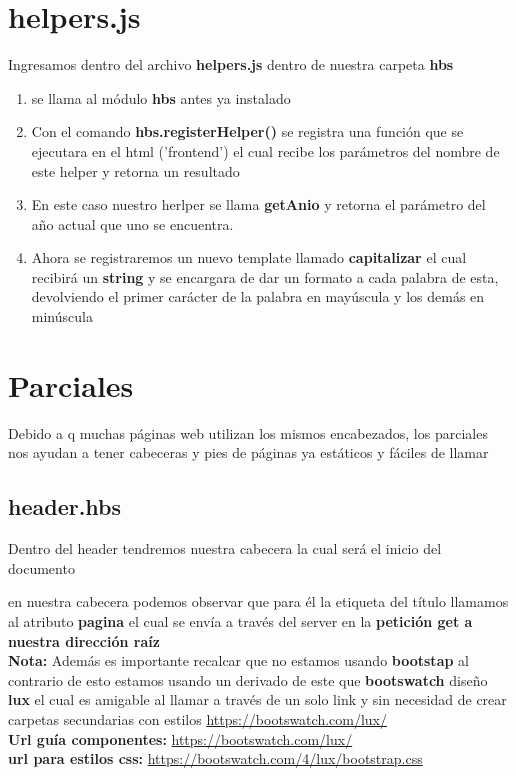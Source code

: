 \documentclass{report}
\begin{document}
\section{helpers.js}
Ingresamos dentro del archivo \textbf{helpers.js} dentro de nuestra carpeta \textbf{hbs}
\begin{enumerate}
  \item se llama al módulo \textbf{hbs} antes ya instalado
  
  \item Con el comando \textbf{hbs.registerHelper()} se registra una función que se ejecutara en el html ('frontend') el cual recibe los parámetros del nombre de este helper y retorna un resultado
  \item En este caso nuestro herlper se llama \textbf{getAnio} y retorna el parámetro del año actual que uno se encuentra.
  
  \item Ahora se registraremos un nuevo template llamado \textbf{capitalizar } el cual recibirá un \textbf{string} y se encargara de dar un formato a cada palabra de esta, devolviendo el primer carácter de la palabra en mayúscula y los demás en minúscula
  
\end{enumerate}



  \section{Parciales}
  Debido a q muchas páginas web utilizan los mismos encabezados, los parciales nos ayudan a tener cabeceras y pies de páginas ya estáticos y fáciles de llamar
  \subsection{header.hbs}
  Dentro del header tendremos nuestra cabecera la cual será el inicio del documento
  
  en nuestra cabecera podemos observar que para él la etiqueta del título llamamos al atributo \textbf{pagina} el cual se envía a través del server en la \textbf{petición get a nuestra dirección raíz}
  \\
  \textbf{Nota:}
  Además es importante recalcar que no estamos usando \textbf{bootstap} al contrario de esto estamos usando un derivado de este que \textbf{bootswatch} diseño \textbf{lux} el cual es amigable al llamar a través de un solo link y sin necesidad de crear carpetas secundarias con estilos \url{https://bootswatch.com/lux/}
  \\
  \textbf{Url guía componentes: } \url{https://bootswatch.com/lux/}
  \\
  \textbf{url para estilos css: } \url{https://bootswatch.com/4/lux/bootstrap.css}
\end{document}
